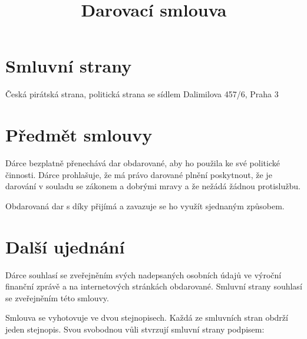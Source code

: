 \documentclass[11pt,a4paper,czech]{article}
\begin{document}
\title{Darovací smlouva}

\begin{Form}

\section{Smluvní strany}

{
     \hfill{} 
   
}

{
   Česká pirátská strana, politická strana se sídlem Dalimilova 457/6, Praha 3
   
}

\section{Předmět smlouvy}

Dárce bezplatně přenechává dar obdarované, aby ho použila ke své politické činnosti. Dárce prohlašuje, že má právo darované plnění poskytnout, že je darování v souladu se zákonem a dobrými mravy a že nežádá žádnou protislužbu. 

Obdarovaná dar s díky přijímá a zavazuje se ho využít sjednaným způsobem.


\section{Další ujednání}

Dárce souhlasí se zveřejněním svých nadepsaných osobních údajů ve výroční finanční zprávě a na internetových stránkách obdarované. Smluvní strany souhlasí se zveřejněním této smlouvy.

Smlouva se vyhotovuje ve dvou stejnopisech. Každá ze smluvních stran obdrží jeden stejnopis. Svou svobodnou vůli stvrzují smluvní strany podpisem:

 

\end{Form}

\hypersetup{pdfborder=0 0 0}
\end{document}
